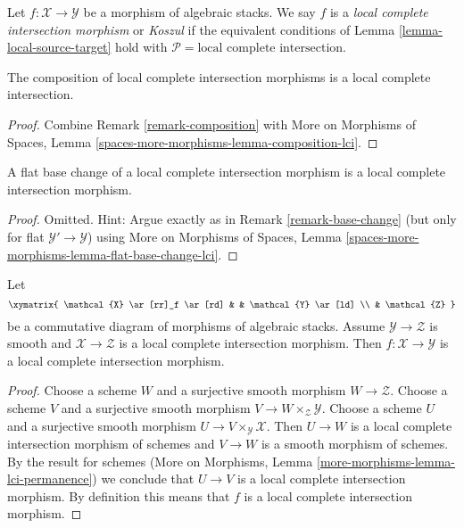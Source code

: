 \begin{definition}
\label{definition-lci}
Let $f : \mathcal{X} \to \mathcal{Y}$ be a morphism of algebraic stacks.
We say $f$ is a {\it local complete intersection morphism} or {\it Koszul}
if the equivalent conditions of
Lemma \ref{lemma-local-source-target}
hold with $\mathcal{P} = \text{local complete intersection}$.
\end{definition}

\begin{lemma}
\label{lemma-composition-lci}
The composition of local complete intersection morphisms is
a local complete intersection.
\end{lemma}

\begin{proof}
Combine
Remark \ref{remark-composition}
with
More on Morphisms of Spaces, Lemma
\ref{spaces-more-morphisms-lemma-composition-lci}.
\end{proof}

\begin{lemma}
\label{lemma-flat-base-change-lci}
A flat base change of a local complete intersection morphism is
a local complete intersection morphism.
\end{lemma}

\begin{proof}
Omitted. Hint: Argue exactly as in Remark \ref{remark-base-change}
(but only for flat $\mathcal{Y}' \to \mathcal{Y}$) using
More on Morphisms of Spaces, Lemma
\ref{spaces-more-morphisms-lemma-flat-base-change-lci}.
\end{proof}

\begin{lemma}
\label{lemma-lci-permanence}
Let
$$
\xymatrix{
\mathcal{X} \ar[rr]_f \ar[rd] & & \mathcal{Y} \ar[ld] \\
& \mathcal{Z}
}
$$
be a commutative diagram of morphisms of algebraic stacks.
Assume $\mathcal{Y} \to \mathcal{Z}$ is smooth and
$\mathcal{X} \to \mathcal{Z}$ is a local complete intersection morphism.
Then $f : \mathcal{X} \to \mathcal{Y}$ is a
local complete intersection morphism.
\end{lemma}

\begin{proof}
Choose a scheme $W$ and a surjective smooth morphism $W \to \mathcal{Z}$.
Choose a scheme $V$ and a surjective smooth morphism
$V \to W \times_\mathcal{Z} \mathcal{Y}$.
Choose a scheme $U$ and a surjective smooth morphism
$U \to V \times_\mathcal{Y} \mathcal{X}$.
Then $U \to W$ is a local complete intersection morphism of schemes and
$V \to W$ is a smooth morphism of schemes. By the result for schemes
(More on Morphisms, Lemma \ref{more-morphisms-lemma-lci-permanence})
we conclude that $U \to V$ is a local complete intersection morphism.
By definition this means that $f$ is a local complete intersection morphism.
\end{proof}





